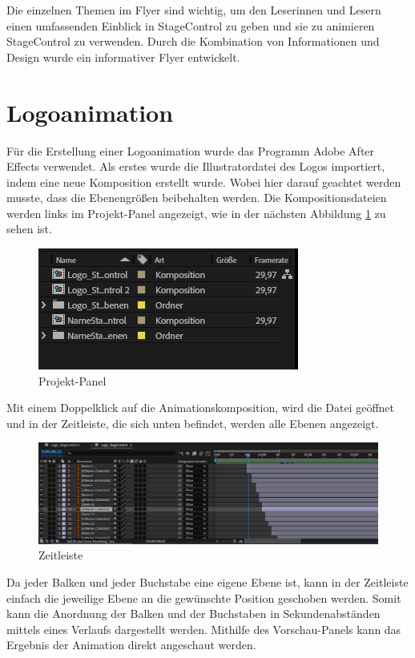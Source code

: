 Die einzelnen Themen im Flyer sind wichtig, um den Leserinnen und Lesern einen umfassenden Einblick in StageControl zu geben und sie zu animieren StageControl zu verwenden. Durch die Kombination von Informationen und Design wurde ein informativer Flyer entwickelt. 

\section{Logoanimation}
Für die Erstellung einer Logoanimation wurde das Programm Adobe After Effects verwendet. Als erstes wurde die Illustratordatei des Logos importiert, indem eine neue Komposition erstellt wurde. Wobei hier darauf geachtet werden musste, dass die Ebenengrößen beibehalten werden. Die Kompositionsdateien werden links im Projekt-Panel angezeigt, wie in der nächsten Abbildung \ref{fig:Projekt-Panel} zu sehen ist.

\begin{figure}[H]
	\centering
	\includegraphics[width=0.5\linewidth]{images/Projekt-Panel.png}
	\caption[Projekt-Panel]{Projekt-Panel}
	\label{fig:Projekt-Panel}
\end{figure} 

Mit einem Doppelklick auf die Animationskomposition, wird die Datei geöffnet und in der Zeitleiste, die sich unten befindet, werden alle Ebenen angezeigt. 

\begin{figure}[H]
	\centering
	\includegraphics[width=0.9\linewidth]{images/Zeitleiste.png}
	\caption[Zeitleiste]{Zeitleiste}
	\label{fig:Zeitleiste}
\end{figure} 

\newpage
Da jeder Balken und jeder Buchstabe eine eigene Ebene ist, kann in der Zeitleiste einfach die jeweilige Ebene an die gewünschte Position geschoben werden. Somit kann die Anordnung der Balken und der Buchstaben in Sekundenabständen mittels eines Verlaufs dargestellt werden. Mithilfe des Vorschau-Panels kann das Ergebnis der Animation direkt angeschaut werden. 

